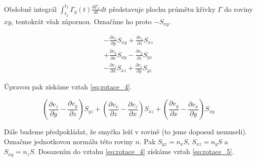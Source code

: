 
Obdobně integrál \(\int_{t_1}^{t_2} \Gamma_y(t) \frac{d \Gamma_x}{dt} dt\) představuje plochu průmětu křivky \(\Gamma\) do roviny \(xy\), tentokrát však zápornou. Označíme ho proto \(-S_{xy}\).

\begin{equation}
\label{eq:rotace_3}
\begin{matrix}
-\frac{\partial v_x}{\partial y} S_{xy} + \frac{\partial v_x}{\partial z} S_{xz} \\
+ \frac{\partial v_y}{\partial x} S_{xy} - \frac{\partial v_y}{\partial z} S_{yz} \\
- \frac{\partial v_z}{\partial x} S_{xz} + \frac{\partial v_z}{\partial y} S_{yz}
\end{matrix}
\end{equation}

Úpravou pak získáme vztah \eqref{eq:rotace_4}.

\begin{equation}
\label{eq:rotace_4}
\left( \frac{\partial v_z}{\partial y} - \frac{\partial v_y}{\partial z} \right) S_{yz} + \left( \frac{\partial v_x}{\partial z} - \frac{\partial v_z}{\partial x} \right) S_{xz} + \left( \frac{\partial v_y}{\partial x} - \frac{\partial v_x}{\partial y} \right) S_{xy} 
\end{equation}

Dále budeme předpokládat, že smyčka leží v rovině (to jsme doposud nemuseli). Označme jednotkovou normálu této roviny \(n\). Pak \(S_{yz} = n_x S\), \(S_{xz} = n_y S\) a \(S_{xy} = n_z S\). Dosazením do vztahu \eqref{eq:rotace_4} získáme vztah \eqref{eq:rotace_5}.

